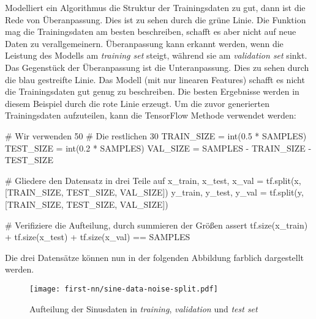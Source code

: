 \noindent
Modelliert ein Algorithmus die Struktur der Trainingsdaten zu gut, dann
ist die Rede von Überanpassung. Dies ist zu sehen
durch die grüne Linie. Die Funktion mag die Trainingsdaten
am besten beschreiben, schafft es aber nicht auf neue
Daten zu verallgemeinern.
Überanpassung kann erkannt werden, wenn die Leistung des Modells am
\textit{training set} steigt, während sie am \textit{validation set}
sinkt. Das Gegenstück der Überanpassung ist die
Unteranpassung. Dies zu sehen durch die blau gestreifte Linie.
Das Modell (mit nur linearen Features)
schafft es nicht die Trainingsdaten gut genug zu beschreiben.
Die besten Ergebnisse werden in diesem Beispiel durch die rote Linie erzeugt.
Um die zuvor generierten Trainingsdaten aufzuteilen,
kann die TensorFlow Methode 
verwendet werden:
\begin{pythoncode}
# Wir verwenden 50%
# Die restlichen 30%
TRAIN_SIZE = int(0.5 * SAMPLES)
TEST_SIZE = int(0.2 * SAMPLES)
VAL_SIZE = SAMPLES - TRAIN_SIZE - TEST_SIZE

# Gliedere den Datensatz in drei Teile auf
x_train, x_test, x_val = tf.split(x, [TRAIN_SIZE, TEST_SIZE, VAL_SIZE])
y_train, y_test, y_val = tf.split(y, [TRAIN_SIZE, TEST_SIZE, VAL_SIZE])

# Verifiziere die Aufteilung, durch summieren der Größen
assert tf.size(x_train) + tf.size(x_test) + tf.size(x_val) == SAMPLES
\end{pythoncode}
Die drei Datensätze können nun in der folgenden Abbildung farblich dargestellt werden.
\begin{figure}[h!]
  \centering
  \texttt{[image: first-nn/sine-data-noise-split.pdf]}
  \caption{Aufteilung der Sinusdaten in
  \textit{training}, \textit{validation} und \textit{test set}}
\end{figure}

